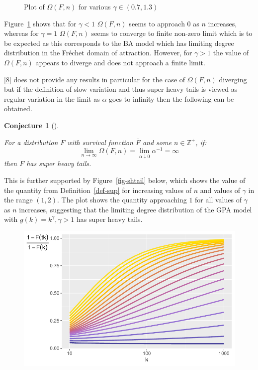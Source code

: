 \documentclass[
  10pt,
  a4paper,
]{scrreprt}
\theoremstyle{plain}
\newtheorem{conjecture}{Conjecture}[section]
\theoremstyle{definition}
\theoremstyle{plain}
\theoremstyle{remark}
\begin{document}
{\begin{figure}[H]
{}

\caption{\label{fig-omega}Plot of \(\Omega(F,n)\) for various
\(\gamma \in (0.7,1.3)\)}

\end{figure}

Figure~\ref{fig-omega} shows that for \(\gamma<1\) \(\Omega(F,n)\) seems
to approach 0 as \(n\) increases, whereas for \(\gamma=1\)
\(\Omega(F,n)\) seems to converge to finite non-zero limit which is to
be expected as this corresponds to the BA model which has limiting
degree distribution in the Fréchet domain of attraction. However, for
\(\gamma>1\) the value of \(\Omega(F,n)\) appears to diverge and does
not approach a finite limit.

{[}\protect\hyperlink{ref-shimura12}{8}{]} does not provide any results
in particular for the case of \(\Omega(F,n)\) diverging but if the
definition of slow variation and thus super-heavy tails is viewed as
regular variation in the limit as \(\alpha\) goes to infinity then the
following can be obtained.

\begin{conjecture}[]\protect\hypertarget{cnj-omg}{}\label{cnj-omg}

For a distribution \(F\) with survival function \(\overline F\) and some
\(n\in\mathbb Z^+\), if: \[
\lim_{n\rightarrow\infty} \Omega(F,n) = \lim_{\alpha\downarrow0} \alpha^{-1} = \infty
\] then \(F\) has super heavy tails.

\end{conjecture}

This is further supported by Figure~\ref{fig-shtail} below, which shows
the value of the quantity from Definition~\ref{def-sup} for increasing
values of \(n\) and values of \(\gamma\) in the range \((1,2)\). The
plot shows the quantity approaching \(1\) for all values of \(\gamma\)
as \(n\) increases, suggesting that the limiting degree distribution of
the GPA model with \(g(k) = k^\gamma,\gamma>1\) has super heavy tails.

\begin{figure}[H]

{\centering \includegraphics{doc_files/figure-pdf/fig-shtail-1.pdf}

}
\end{figure}}
\end{document}
